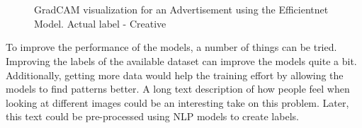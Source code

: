 \documentclass[conference]{IEEEtran}
\begin{document}
\begin{figure}
    
  \\
  \\
  \caption{GradCAM visualization for an Advertisement using the Efficientnet Model. Actual label - Creative}
  \label{fig:gradcam_7}
\end{figure}

To improve the performance of the models, a number of things can be tried. 
Improving the labels of the available dataset can improve the models quite a bit. 
Additionally, getting more data would help the training effort by allowing the models 
to find patterns better. A long text description of how people feel when looking at 
different images could be an interesting take on this problem. Later, this text could 
be pre-processed using NLP models to create labels. 
\end{document}
